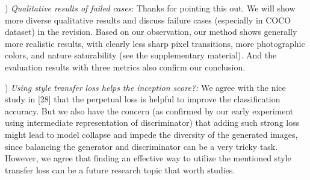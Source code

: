 \documentclass[10pt,twocolumn,letterpaper]{article}
\begin{document}
) \textit{Qualitative results of failed cases}: Thanks for pointing this out. We will show more diverse qualitative results and discuss failure cases (especially in COCO dataset) in the revision. Based on our observation, our method shows generally more realistic results, with clearly less sharp pixel transitions, more photographic colors, and nature saturability (see the supplementary material). And the evaluation results with three metrics also confirm our conclusion.



) \textit{Using style transfer loss helps the inception score?:} 
We agree with the nice study in [28] that the perpetual loss is helpful to improve the classification accuracy.
But we also have the concern (as confirmed by our early experiment using intermediate representation of discriminator) that adding such strong loss might lead to model collapse and impede the diversity of the generated images, since balancing the generator and discriminator can be a very tricky task. However, we agree that finding an effective way to utilize the mentioned style transfer loss can be a future research topic that worth studies. 
 


\end{document}
